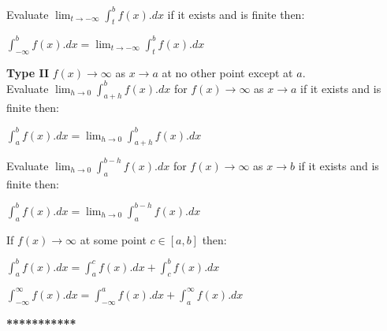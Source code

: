Evaluate $ \displaystyle \lim_{t \to -\infty}\int_{t}^{b} f(x).dx $ if it exists and is finite then: \\[3mm]
\begin{tcolorbox}
\begin{center}
$ \displaystyle \int_{-\infty}^{b} f(x).dx = \lim_{t \to -\infty}\int_{t}^{b} f(x).dx $
\end{center}
\end{tcolorbox}

\vspace{5mm}

\noindent
\textbf{Type II} 
\vspace{2mm}
$f(x) \to \infty$ as $x \to a$ at no other point except at $a$. \\[2mm]

\noindent
Evaluate $ \displaystyle \lim_{h \to 0}\int_{a+h}^{b} f(x).dx $ for $f(x) \to \infty$ as $x \to a$ if it exists and is finite then: \\[3mm]

\begin{tcolorbox}
\begin{center}
$ \displaystyle \int_{a}^{b} f(x).dx = \lim_{h \to 0}\int_{a+h}^{b} f(x).dx $ 
\end{center}
\end{tcolorbox}

\noindent
Evaluate $ \displaystyle \lim_{h \to 0}\int_{a}^{b-h} f(x).dx $ for $f(x) \to \infty $ as $x \to b$ if it exists and is finite then: \\[3mm]

\begin{tcolorbox}
\begin{center}
$ \displaystyle \int_{a}^{b} f(x).dx = \lim_{h \to 0}\int_{a}^{b-h} f(x).dx $ 
\end{center}
\end{tcolorbox}

\vspace{5mm}

\noindent
If $ \displaystyle f(x) \to \infty $ at some point $c \in [a,b]$ then: \\[3mm]

\begin{tcolorbox}
\begin{center}
$ \displaystyle \int_{a}^{b} f(x).dx = \int_{a}^{c} f(x).dx + \int_{c}^{b} f(x).dx $
\end{center}
\end{tcolorbox}

\vspace{5mm}

\begin{tcolorbox}
\begin{center}
$ \displaystyle \int_{-\infty}^{\infty} f(x).dx = \int_{-\infty}^{a} f(x).dx + \int_{a}^{\infty} f(x).dx $
\end{center}
\end{tcolorbox}

\vspace{5mm}
\begin{center}
\textbf{***********}
\end{center}

